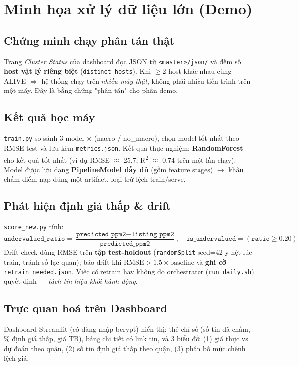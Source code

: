 \documentclass[12pt,a4paper]{article}
\begin{document}
\section{Minh họa xử lý dữ liệu lớn (Demo)}

\subsection{Chứng minh chạy phân tán thật}
Trang \textit{Cluster Status} của dashboard đọc JSON từ \texttt{<master>/json/} và đếm số \textbf{host vật lý riêng biệt} (\texttt{distinct\_hosts}). Khi $\geq$2 host khác nhau cùng ALIVE $\Rightarrow$ hệ thống chạy trên \textit{nhiều máy thật}, không phải nhiều tiến trình trên một máy. Đây là bằng chứng "phân tán" cho phần demo.

\subsection{Kết quả học máy}
\texttt{train.py} so sánh 3 model $\times$ (macro / no\_macro), chọn model tốt nhất theo RMSE test và lưu kèm \texttt{metrics.json}. Kết quả thực nghiệm: \textbf{RandomForest} cho kết quả tốt nhất (ví dụ RMSE $\approx$ 25.7, R\textsuperscript{2} $\approx$ 0.74 trên một lần chạy). Model được lưu dạng \textbf{PipelineModel đầy đủ} (gồm feature stages) $\rightarrow$ khâu chấm điểm nạp đúng một artifact, loại trừ lệch train/serve.

\subsection{Phát hiện định giá thấp \& drift}
\texttt{score\_new.py} tính:
\[
\texttt{undervalued\_ratio} = \frac{\texttt{predicted\_ppm2} - \texttt{listing\_ppm2}}{\texttt{predicted\_ppm2}}, \quad
\texttt{is\_undervalued} = (\texttt{ratio} \geq 0.20)
\]
Drift check dùng RMSE trên \textbf{tập test-holdout} (\texttt{randomSplit} seed=42 y hệt lúc train, tránh số lạc quan); báo drift khi $\text{RMSE} > 1.5 \times \text{baseline}$ và \textbf{ghi cờ} \texttt{retrain\_needed.json}. Việc có retrain hay không do orchestrator (\texttt{run\_daily.sh}) quyết định --- \textit{tách tín hiệu khỏi hành động}.

\subsection{Trực quan hoá trên Dashboard}
Dashboard Streamlit (có đăng nhập bcrypt) hiển thị: thẻ chỉ số (số tin đã chấm, \% định giá thấp, giá TB), bảng chi tiết có link tin, và 3 biểu đồ: (1) giá thực vs dự đoán theo quận, (2) số tin định giá thấp theo quận, (3) phân bố mức chênh lệch giá.
\end{document}
